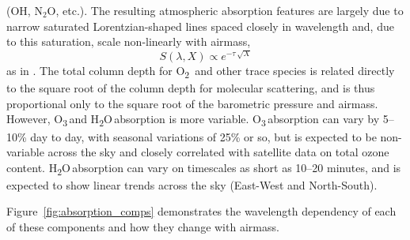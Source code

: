 \documentclass[12pt,preprint]{aastex}
\newcommand{\water}   {H\textsubscript{2}O}
\newcommand{\ozone}    {O\textsubscript{3}}
\newcommand{\oxy}     {O\textsubscript{2}}
\begin{document}
\begin{itemize}
{(OH, N$_2$O, etc.). The resulting atmospheric absorption features are largely due
to narrow saturated Lorentzian-shaped lines spaced closely in
wavelength and, due to this saturation, scale non-linearly with
airmass, 
\begin{equation}
S(\lambda, X) \propto e^{-\tau\,\sqrt X}
\end{equation} 
as in \citet{Stubbs2007b}. The total column depth for \oxy\, and other
trace species is related directly to the square root of the column depth for molecular
scattering, and is thus proportional only to the square root of the
barometric pressure and airmass. However, \ozone\,and \water\,absorption
is more variable. \ozone\,absorption can vary by
5--10\% day to day, with seasonal variations of 25\% or so, but is
expected to be non-variable across the sky and closely correlated with
satellite data on total ozone content. \water\,absorption can vary on timescales as short as
10--20 minutes, and is expected to show linear trends across the sky
(East-West and North-South). 
}
\end{itemize}
Figure~\ref{fig:absorption_comps} demonstrates the
wavelength dependency of each of these components and how they change
with airmass. 
\end{document}
